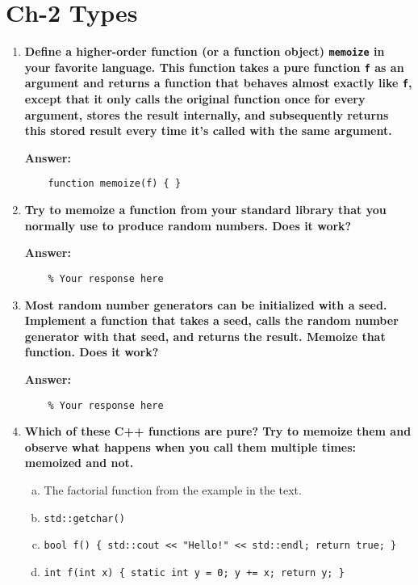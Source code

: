 \documentclass{article}
\begin{document}
\section{Ch-2 Types}
\begin{enumerate}
	\item \textbf{Define a higher-order function (or a function object) \texttt{memoize} in your favorite language. This function takes a pure function \texttt{f} as an argument and returns a function that behaves almost exactly like \texttt{f}, except that it only calls the original function once for every argument, stores the result internally, and subsequently returns this stored result every time it’s called with the same argument.}

	      \textbf{Answer:}
	      \begin{verbatim}
    function memoize(f) { }
    \end{verbatim}

	\item \textbf{Try to memoize a function from your standard library that you normally use to produce random numbers. Does it work?}

	      \textbf{Answer:}
	      \begin{verbatim}
    % Your response here
    \end{verbatim}

	\item \textbf{Most random number generators can be initialized with a seed. Implement a function that takes a seed, calls the random number generator with that seed, and returns the result. Memoize that function. Does it work?}

	      \textbf{Answer:}
	      \begin{verbatim}
    % Your response here
    \end{verbatim}

	\item \textbf{Which of these C++ functions are pure? Try to memoize them and observe what happens when you call them multiple times: memoized and not.}
	      \begin{enumerate}[(a)]
		      \item The factorial function from the example in the text.
		      \item \texttt{std::getchar()}
		      \item \texttt{bool f() \{ std::cout << "Hello!" << std::endl; return true; \}}
		      \item \texttt{int f(int x) \{ static int y = 0; y += x; return y; \}}
	      \end{enumerate}


\end{enumerate}
\end{document}
